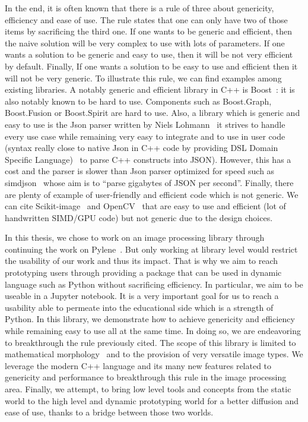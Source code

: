 In the end, it is often known that there is a rule of three about genericity, efficiency and ease of use. The rule
states that one can only have two of those items by sacrificing the third one. If one wants to be generic and efficient,
then the naive solution will be very complex to use with lots of parameters. If one wants a solution to be generic and
easy to use, then it will be not very efficient by default. Finally, If one wants a solution to be easy to use and
efficient then it will not be very generic. To illustrate this rule, we can find examples among existing libraries. A
notably generic and efficient library in C++ is Boost~\parencite{boost.2021}: it is also notably known to be hard to
use. Components such as Boost.Graph, Boost.Fusion or Boost.Spirit are hard to use. Also, a library which is generic and
easy to use is the Json parser written by Niels Lohmann~\parencite{nlohmann.2021.json} it strives to handle every use
case while remaining very easy to integrate and to use in user code (syntax really close to native Json in C++ code by
providing DSL Domain Specific Language)~\parencite{deursen.2000.DSL} to parse C++ constructs into JSON). However, this
has a cost and the parser is slower than Json parser optimized for speed such as
simdjson~\parencite{lemire.2021.simdjson} whose aim is to ``parse gigabytes of JSON per second''. Finally, there are
plenty of example of user-friendly and efficient code which is not generic. We can cite
Scikit-image~\parencite{vanderwalt.2014.skimage} and OpenCV~\parencite{bradski.2000.opencv} that are easy to use and
efficient (lot of handwritten SIMD/GPU code) but not generic due to the design choices.

In this thesis, we chose to work on an image processing library through continuing the work on
Pylene~\parencite{carlinet.2018.pylena}. But only working at library level would restrict the usability of our work and
thus its impact. That is why we aim to reach prototyping users through providing a package that can be used in dynamic
language such as Python without sacrificing efficiency. In particular, we aim to be useable in a Jupyter notebook. It is
a very important goal for us to reach a usability able to permeate into the educational side which is a strength of
Python. In this library, we demonstrate how to achieve genericity and efficiency while remaining easy to use all at the
same time. In doing so, we are endeavoring to breakthrough the rule previously cited. The scope of this library is
limited to mathematical morphology~\parencite{najman.2013.mathematical,geraud.2010.book} and to the provision of very
versatile image types. We leverage the modern C++ language and its many new features related to genericity and
performance to breakthrough this rule in the image processing area. Finally, we attempt, to bring low level tools and
concepts from the static world to the high level and dynamic prototyping world for a better diffusion and ease of use,
thanks to a bridge between those two worlds.

